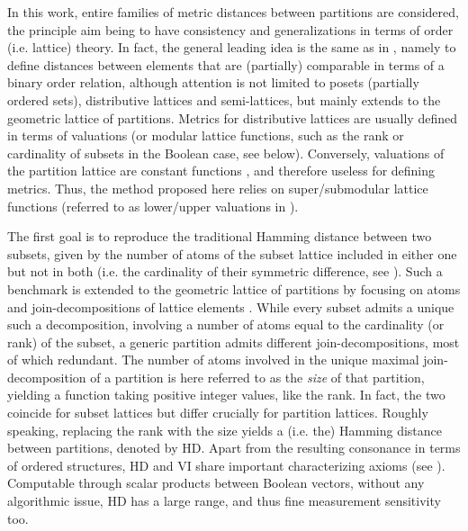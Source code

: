 \documentclass[a4paper,10pt]{article}
\begin{document}
In this work, entire families of metric distances between partitions are considered, the principle aim being to have consistency and generalizations in terms of order (i.e.
lattice) theory. In fact, the general leading idea is the same as in \cite{LeclercMondjardet+1986,Leclerc1993,LeclercMondjardetLatticialConsensus,Monjardet1981},
namely to define distances between elements that are (partially) comparable in terms of a binary order relation, although attention is not limited to posets (partially
ordered sets), distributive lattices and semi-lattices, but mainly extends to the geometric lattice of partitions. Metrics for distributive lattices are usually defined in
terms of valuations (or modular lattice functions, such as the rank or cardinality of subsets in the Boolean case, see below). Conversely, valuations of the partition lattice
are constant functions \cite{Aigner79}, and therefore useless for defining metrics. Thus, the method proposed here relies on super/submodular lattice functions (referred to
as lower/upper valuations in \cite{LeclercMondjardet+1986}).

The first goal is to reproduce the traditional Hamming distance between two subsets, given by the number of atoms of the subset lattice included in either one but not in both
(i.e. the cardinality of their symmetric difference, see \cite{Bollobas86}). Such a benchmark is extended to the geometric lattice of partitions by focusing on atoms and
join-decompositions of lattice elements \cite{Aigner79,Stern99}. While every subset admits a unique such a decomposition, involving a number of atoms equal to the cardinality
(or rank) of the subset, a generic partition admits different join-decompositions, most of which redundant. The number of atoms involved in the unique maximal
join-decomposition of a partition is here referred to as the \textit{size} of that partition, yielding a function taking positive integer values, like the rank. In fact, the
two coincide for subset lattices but differ crucially for partition lattices. Roughly speaking, replacing the rank with the size yields a (i.e. the) Hamming distance between
partitions, denoted by HD. Apart from the resulting consonance in terms of ordered structures, HD and VI share important characterizing axioms (see \cite{Meila2007}).
Computable through scalar products between Boolean vectors, without any algorithmic issue, HD has a large range, and thus fine measurement sensitivity too.
\end{document}
